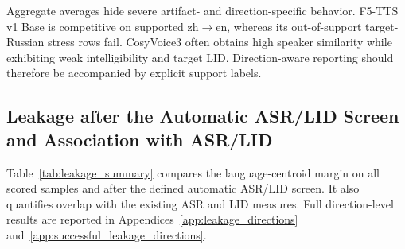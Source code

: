 \documentclass[11pt]{article}
\begin{document}
\begin{table}[t]
\centering
\caption{Selected per-direction results showing contrasting behavior. F5-TTS target Russian is an out-of-support stress condition. CIs use the crossed reference/text bootstrap.}
\label{tab:selected_directions}
\end{table}

Aggregate averages hide severe artifact- and direction-specific behavior. F5-TTS v1 Base is competitive on supported zh$\rightarrow$en, whereas its out-of-support target-Russian stress rows fail. CosyVoice3 often obtains high speaker similarity while exhibiting weak intelligibility and target LID. Direction-aware reporting should therefore be accompanied by explicit support labels.

\subsection{Leakage after the Automatic ASR/LID Screen and Association with ASR/LID}

Table~\ref{tab:leakage_summary} compares the language-centroid margin on all scored samples and after the defined automatic ASR/LID screen. It also quantifies overlap with the existing ASR and LID measures. Full direction-level results are reported in Appendices~\ref{app:leakage_directions} and~\ref{app:successful_leakage_directions}.
\end{document}
